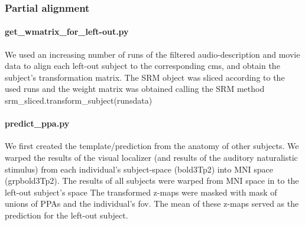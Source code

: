 \subsubsection{Partial alignment}


\paragraph{get\_wmatrix\_for\_left-out.py}

We used an increasing number of runs of the filtered audio-description and movie
data to align each left-out subject to the corresponding \ac{cms}, and obtain
the subject's transformation matrix.
%
The SRM object was sliced according to the used runs and the weight matrix was
obtained calling the SRM method srm\_sliced.transform\_subject(runsdata)


\paragraph{predict\_ppa.py}


We first created the template/prediction from the anatomy of other subjects.
%
We warped the results of the visual localizer (and results of the auditory
naturalistic stimulus) from each individual's subject-space (bold3Tp2) into MNI
space (grpbold3Tp2).
The results of all subjects were warped from MNI space in to the left-out
subject's space
The transformed z-maps were masked with mask of unions of PPAs and the
individual's \ac{fov}.
%
The mean of these z-maps served as the prediction for the left-out subject.

